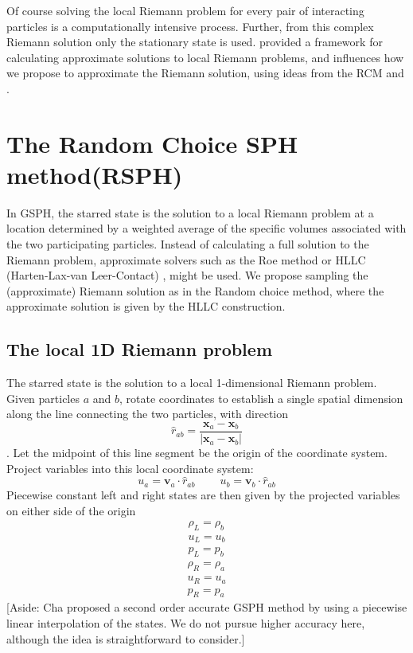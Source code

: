 \documentclass[preprint,12pt,authoryear]{elsarticle}
\begin{document}
Of course solving the local Riemann problem for every pair of interacting particles is a computationally intensive process. Further, from this complex Riemann solution only the stationary state is used. \citet{hll} provided a framework for calculating approximate solutions to local Riemann problems, and influences how we propose to approximate the  Riemann solution, using ideas from the RCM and \citet{hartenlax}.

\section{The Random Choice SPH method(RSPH)} \label{sec:RSPH-method}
In GSPH, the starred state is the solution to a local Riemann problem at a location determined by a weighted average of the specific volumes associated with the two participating particles. 
Instead of calculating a full solution to the Riemann problem, approximate solvers such as the Roe method \citep{roe1981approximate} or HLLC (Harten-Lax-van Leer-Contact) \citep{toro1994restoration}, might be used. 
We propose sampling the (approximate) Riemann solution as in the Random choice method, where the approximate solution is given by the HLLC construction.

\subsection{The local 1D Riemann problem} \label{sec:RP-construction}
The starred state is the solution to a local 1-dimensional Riemann problem. Given particles $a$ and $b$, rotate coordinates to establish a single spatial dimension along the line connecting the two particles, with direction 
\begin{equation}
\hat{r}_{a b}= \frac{\textbf{x}_{a} - \textbf{x}_{ b}}{|\textbf{x}_{a} - \textbf{x}_{ b}|}
\end{equation}. 
Let the midpoint of this line segment be the origin of the coordinate system. Project variables into this local coordinate system:
\begin{equation}
u_{a}= \textbf{v}_{a} \cdot \hat{r}_{a b}
~~~~~~~~~~
u_{b}= \textbf{v}_{b} \cdot \hat{r}_{a b}
\label{eq:RP-project-2-local}
\end{equation}
Piecewise constant left and right states are then given by the projected variables on either side of the origin
\begin{eqnarray}
\rho_L = \rho_b 
\label{eq:Riemann-Prob-define-L-rho} \\
u_L = u_b 
\label{eq:Riemann-Prob-define-L-v} \\
p_L = p_b 
\label{eq:Riemann-Prob-define-L-p}
\end{eqnarray}
\begin{eqnarray}
\rho_R = \rho_a 
\label{eq:Riemann-Prob-define-R-rho} \\
u_R = u_a 
\label{eq:Riemann-Prob-define-R-v} \\
p_R = p_a 
\label{eq:Riemann-Prob-define-R-p}
\end{eqnarray}
[Aside: Cha \cite{cha2003implementations} proposed a second order accurate GSPH method by using
a piecewise linear interpolation of the states. We do not pursue higher accuracy here, although the idea is straightforward to consider.]
\end{document}

